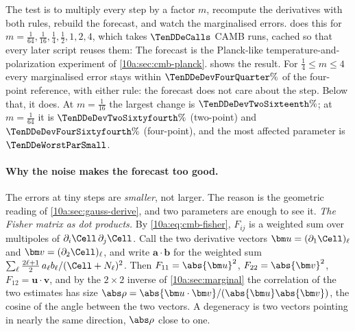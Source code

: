 The test is to multiply every step by a factor $m$, recompute the derivatives with both rules, rebuild the
forecast, and watch the marginalised errors.  does this for
$m=\frac1{64},\frac1{16},\frac14,\frac12,1,2,4$, which takes $\TenDDeCalls$ CAMB runs, cached so that every later script
reuses them:
The forecast is the Planck-like temperature-and-polarization experiment of \cref{10a:sec:cmb-planck}.
 shows the result. For $\frac14\le m\le4$ every marginalised error stays within
$\TenDDeDevFourQuarter\%$ of the four-point reference, with either rule: the forecast does not care about the
step. Below that, it does. At $m=\frac1{16}$ the largest change is $\TenDDeDevTwoSixteenth\%$; at $m=\frac1{64}$ it is
$\TenDDeDevTwoSixtyfourth\%$ (two-point) and $\TenDDeDevFourSixtyfourth\%$ (four-point), and the most affected parameter
is $\TenDDeWorstParSmall$.

\paragraph{Why the noise makes the forecast too good.} The errors at tiny steps are \emph{smaller}, not larger.
The reason is the geometric reading of \cref{10a:sec:gauss-derive}, and two parameters are enough to see it.
\emph{The Fisher matrix as dot products.} By \eqref{10a:eq:cmb-fisher}, $F_{ij}$ is a weighted sum over multipoles of
$\partial_i\Cell\,\partial_j\Cell$. Call the two derivative vectors $\bm u=(\partial_1\Cell)_\ell$ and $\bm v=(\partial_2\Cell)_\ell$, and
write $\bm a\cdot\bm b$ for the weighted sum $\sum_\ell\frac{2\ell+1}2\,a_\ell b_\ell/(\Cell+N_\ell)^2$. Then
$F_{11}=\abs{\bm u}^2$, $F_{22}=\abs{\bm v}^2$, $F_{12}=\bm u\cdot\bm v$, and by the $2\times2$ inverse of \cref{10a:sec:marginal}
the correlation of the two estimates has size $\abs\rho=\abs{\bm u\cdot\bm v}/(\abs{\bm u}\abs{\bm v})$, the cosine of the angle
between the two vectors. A degeneracy is two vectors pointing in nearly the same direction, $\abs\rho$ close to one.

